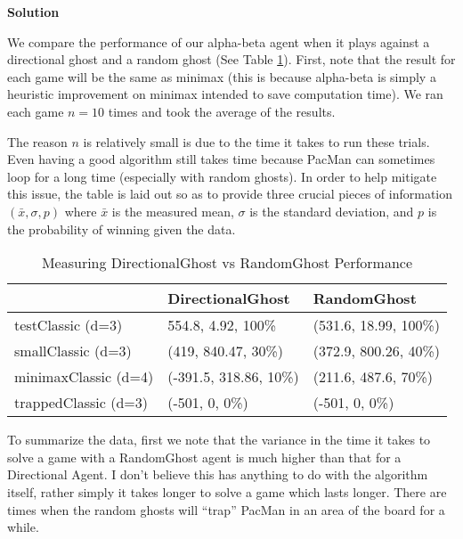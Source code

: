 \documentclass[11pt]{article}
\newcounter{AnswerCounter}
\newcounter{SubAnswerCounter}
\newenvironment{answer}[0]{
  \setcounter{SubAnswerCounter}{1}
  \bigskip
  \textbf{Solution \arabic{AnswerCounter}}
  \\
  \begin{small}
}{
  \end{small}
  \stepcounter{AnswerCounter}
}
\begin{document}
\begin{answer}
We compare the performance of our alpha-beta agent when it plays against a directional ghost and a random ghost (See Table \ref{tab:ghosts}). First, note that the result for each game will be the same as minimax (this is because alpha-beta is simply a heuristic improvement on minimax intended to save computation time). We ran each game $n=10$ times and took the average of the results.

The reason $n$ is relatively small is due to the time it takes to run these trials. Even having a good algorithm still takes time because PacMan can sometimes loop for a long time (especially with random ghosts). In order to help mitigate this issue, the table is laid out so as to provide three crucial pieces of information $(\bar{x}, \sigma, p)$ where $\bar{x}$ is the measured mean, $\sigma$ is the standard deviation, and $p$ is the probability of winning given the data.

\begin{table}[]
\centering
\caption{Measuring DirectionalGhost vs RandomGhost Performance}
\label{tab:ghosts}
\begin{tabular}{|l|l|l|}
\hline
                     & DirectionalGhost       & RandomGhost           \\ \hline
testClassic (d=3)    & 554.8, 4.92, 100\%     & (531.6, 18.99, 100\%) \\ \hline
smallClassic (d=3)   & (419, 840.47, 30\%)    & (372.9, 800.26, 40\%) \\ \hline
minimaxClassic (d=4) & (-391.5, 318.86, 10\%) & (211.6, 487.6, 70\%)  \\ \hline
trappedClassic (d=3) & (-501, 0, 0\%)         & (-501, 0, 0\%)        \\ \hline
\end{tabular}
\end{table}


To summarize the data, first we note that the variance in the time it takes to solve a game with a RandomGhost agent is much higher than that for a Directional Agent. I don't believe this has anything to do with the algorithm itself, rather simply it takes longer to solve a game which lasts longer. There are times when the random ghosts will ``trap'' PacMan in an area of the board for a while.


\end{answer}
\end{document}
